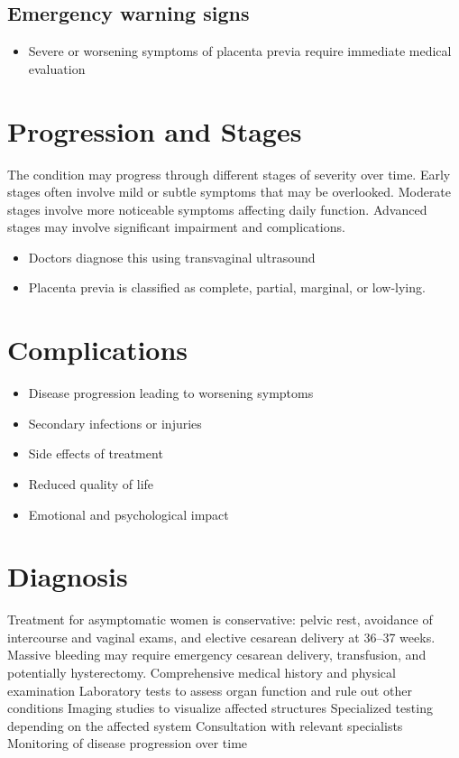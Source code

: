 \subsection{Emergency warning signs}
\begin{itemize}[noitemsep]
  \item Severe or worsening symptoms of placenta previa require immediate medical evaluation
\end{itemize}
\section{Progression and Stages}
The condition may progress through different stages of severity over time. Early stages often involve mild or subtle symptoms that may be overlooked. Moderate stages involve more noticeable symptoms affecting daily function. Advanced stages may involve significant impairment and complications.

\begin{itemize}[noitemsep]
  \item Doctors diagnose this using transvaginal ultrasound
  \item Placenta previa is classified as complete, partial, marginal, or low-lying.
\end{itemize}
\section{Complications}
\begin{itemize}[noitemsep]
  \item Disease progression leading to worsening symptoms
  \item Secondary infections or injuries
  \item Side effects of treatment
  \item Reduced quality of life
  \item Emotional and psychological impact
\end{itemize}
\section{Diagnosis}
Treatment for asymptomatic women is conservative: pelvic rest, avoidance of intercourse and vaginal exams, and elective cesarean delivery at 36--37 weeks. Massive bleeding may require emergency cesarean delivery, transfusion, and potentially hysterectomy. Comprehensive medical history and physical examination Laboratory tests to assess organ function and rule out other conditions Imaging studies to visualize affected structures Specialized testing depending on the affected system Consultation with relevant specialists Monitoring of disease progression over time

